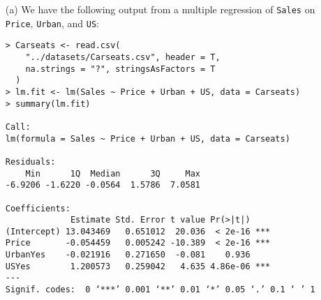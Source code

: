 
\begin{itemize}
    \item[(a)] We have the following output from a multiple regression of \verb|Sales|
        on \verb|Price|, \verb|Urban|, and \verb|US|:
        \scriptsize\begin{verbatim}
> Carseats <- read.csv(
    "../datasets/Carseats.csv", header = T, 
    na.strings = "?", stringsAsFactors = T
  )
> lm.fit <- lm(Sales ~ Price + Urban + US, data = Carseats)
> summary(lm.fit)

Call:
lm(formula = Sales ~ Price + Urban + US, data = Carseats)

Residuals:
    Min      1Q  Median      3Q     Max 
-6.9206 -1.6220 -0.0564  1.5786  7.0581 

Coefficients:
             Estimate Std. Error t value Pr(>|t|)    
(Intercept) 13.043469   0.651012  20.036  < 2e-16 ***
Price       -0.054459   0.005242 -10.389  < 2e-16 ***
UrbanYes    -0.021916   0.271650  -0.081    0.936    
USYes        1.200573   0.259042   4.635 4.86e-06 ***
---
Signif. codes:  0 ‘***’ 0.001 ‘**’ 0.01 ‘*’ 0.05 ‘.’ 0.1 ‘ ’ 1


\end{verbatim}
\end{itemize}
